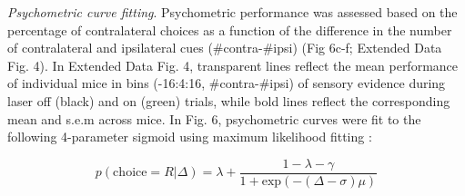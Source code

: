 \textit{Psychometric curve fitting}. Psychometric performance was assessed based on the percentage of contralateral choices as a function of the difference in the number of contralateral and ipsilateral cues (\#contra-\#ipsi) (Fig 6c-f; Extended Data Fig. 4). In Extended Data Fig. 4, transparent lines reflect the mean performance of individual mice in bins (-16:4:16, \#contra-\#ipsi) of sensory evidence during laser off (black) and on (green) trials, while bold lines reflect the corresponding mean and s.e.m across mice. In Fig. 6, psychometric curves were fit to the following 4-parameter sigmoid using maximum likelihood fitting \cite{wichmann_psychometric_2001}: 

\begin{equation} \label{meq3}
p\left( {{{{\mathrm{choice}}}} = R |{{\Delta }}} \right) = \lambda + \frac{{1 - \lambda - \gamma }}{{1 + {{{\mathrm{exp}}}}\left( { - \left( {{{\Delta }} - {\sigma}} \right){\mu}} \right)}}
\end{equation}

